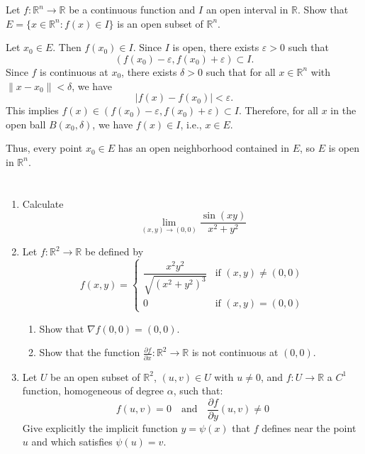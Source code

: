 \documentclass[12pt]{article}
\begin{document}
\section{}
Let \( f : \mathbb{R}^n \to \mathbb{R} \) be a continuous function and \( I \) an open interval in \( \mathbb{R} \).  
Show that \( E = \{ x \in \mathbb{R}^n : f(x) \in I \} \) is an open subset of \( \mathbb{R}^n \).

\begin{answerbox}
Let \( x_0 \in E \). Then \( f(x_0) \in I \). Since \( I \) is open, there exists \( \varepsilon > 0 \) such that
\[
(f(x_0) - \varepsilon, f(x_0) + \varepsilon) \subset I.
\]
Since \( f \) is continuous at \( x_0 \), there exists \( \delta > 0 \) such that for all \( x \in \mathbb{R}^n \) with \( \|x - x_0\| < \delta \), we have
\[
|f(x) - f(x_0)| < \varepsilon.
\]
This implies \( f(x) \in (f(x_0) - \varepsilon, f(x_0) + \varepsilon) \subset I \). Therefore, for all \( x \) in the open ball \( B(x_0, \delta) \), we have \( f(x) \in I \), i.e., \( x \in E \).

Thus, every point \( x_0 \in E \) has an open neighborhood contained in \( E \), so \( E \) is open in \( \mathbb{R}^n \).
\end{answerbox}

\section{}
\begin{enumerate}
    \item Calculate
    \[
    \lim_{(x,y) \to (0,0)} \frac{\sin(xy)}{x^2 + y^2}
    \]
    
    \item Let \( f : \mathbb{R}^2 \to \mathbb{R} \) be defined by
    \[
    f(x,y) = 
    \begin{cases} 
    \dfrac{x^2 y^2}{\sqrt{(x^2 + y^2)^3}} & \text{if } (x,y) \neq (0,0) \\
    0 & \text{if } (x,y) = (0,0)
    \end{cases}
    \]
    \begin{enumerate}
        \item Show that \( \nabla f(0,0) = (0,0) \).
        \item Show that the function \( \frac{\partial f}{\partial x} : \mathbb{R}^2 \to \mathbb{R} \) is not continuous at \( (0,0) \).
    \end{enumerate}
    
    \item Let \( U \) be an open subset of \( \mathbb{R}^2 \), \( (u,v) \in U \) with \( u \neq 0 \), and \( f : U \to \mathbb{R} \) a \( C^1 \) function, homogeneous of degree \( \alpha \), such that:
    \[
    f(u,v) = 0 \quad \text{and} \quad \frac{\partial f}{\partial y}(u,v) \neq 0
    \]
    Give explicitly the implicit function \( y = \psi(x) \) that \( f \) defines near the point \( u \) and which satisfies \( \psi(u) = v \).
\end{enumerate}
\end{document}
